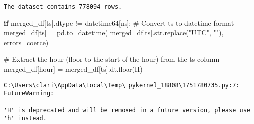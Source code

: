 \documentclass[
  letterpaper,
  DIV=11,
  numbers=noendperiod]{scrartcl}
\newenvironment{Shaded}{\begin{snugshade}}{\end{snugshade}}
\newcommand{\BuiltInTok}[1]{\textcolor[rgb]{0.00,0.23,0.31}{#1}}
\newcommand{\CommentTok}[1]{\textcolor[rgb]{0.37,0.37,0.37}{#1}}
\newcommand{\ControlFlowTok}[1]{\textcolor[rgb]{0.00,0.23,0.31}{\textbf{#1}}}
\newcommand{\NormalTok}[1]{\textcolor[rgb]{0.00,0.23,0.31}{#1}}
\newcommand{\OperatorTok}[1]{\textcolor[rgb]{0.37,0.37,0.37}{#1}}
\newcommand{\StringTok}[1]{\textcolor[rgb]{0.13,0.47,0.30}{#1}}
\begin{document}
\begin{verbatim}
The dataset contains 778094 rows.
\end{verbatim}

\begin{Shaded}
\begin{Highlighting}[]
\ControlFlowTok{if}\NormalTok{ merged\_df[}\StringTok{\textquotesingle{}ts\textquotesingle{}}\NormalTok{].dtype }\OperatorTok{!=} \StringTok{\textquotesingle{}datetime64[ns]\textquotesingle{}}\NormalTok{:}
    \CommentTok{\# Convert \textquotesingle{}ts\textquotesingle{} to datetime format}
\NormalTok{    merged\_df[}\StringTok{\textquotesingle{}ts\textquotesingle{}}\NormalTok{] }\OperatorTok{=}\NormalTok{ pd.to\_datetime(}
\NormalTok{        merged\_df[}\StringTok{\textquotesingle{}ts\textquotesingle{}}\NormalTok{].}\BuiltInTok{str}\NormalTok{.replace(}\StringTok{"UTC"}\NormalTok{, }\StringTok{""}\NormalTok{), errors}\OperatorTok{=}\StringTok{\textquotesingle{}coerce\textquotesingle{}}\NormalTok{)}

\CommentTok{\# Extract the hour (floor to the start of the hour) from the \textquotesingle{}ts\textquotesingle{} column}
\NormalTok{merged\_df[}\StringTok{\textquotesingle{}hour\textquotesingle{}}\NormalTok{] }\OperatorTok{=}\NormalTok{ merged\_df[}\StringTok{\textquotesingle{}ts\textquotesingle{}}\NormalTok{].dt.floor(}\StringTok{\textquotesingle{}H\textquotesingle{}}\NormalTok{)}
\end{Highlighting}
\end{Shaded}

\begin{verbatim}
C:\Users\clari\AppData\Local\Temp\ipykernel_18808\1751780735.py:7: FutureWarning:

'H' is deprecated and will be removed in a future version, please use 'h' instead.
\end{verbatim}
\end{document}
